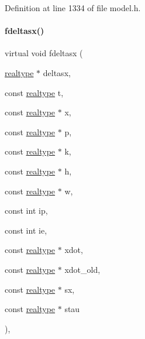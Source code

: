 Definition at line 1334 of file model.\+h.

\mbox{\label{classamici_1_1_model_ac28a487f8f0a893e03271a29098c264f}} 
\paragraph{\texorpdfstring{fdeltasx()}{fdeltasx()}\hspace{0.1cm}{\footnotesize\ttfamily [2/2]}}
{\footnotesize\ttfamily virtual void fdeltasx (\begin{DoxyParamCaption}\item[{\mbox{\hyperlink{namespaceamici_a1bdce28051d6a53868f7ccbf5f2c14a3}{realtype}} $\ast$}]{deltasx,  }\item[{const \mbox{\hyperlink{namespaceamici_a1bdce28051d6a53868f7ccbf5f2c14a3}{realtype}}}]{t,  }\item[{const \mbox{\hyperlink{namespaceamici_a1bdce28051d6a53868f7ccbf5f2c14a3}{realtype}} $\ast$}]{x,  }\item[{const \mbox{\hyperlink{namespaceamici_a1bdce28051d6a53868f7ccbf5f2c14a3}{realtype}} $\ast$}]{p,  }\item[{const \mbox{\hyperlink{namespaceamici_a1bdce28051d6a53868f7ccbf5f2c14a3}{realtype}} $\ast$}]{k,  }\item[{const \mbox{\hyperlink{namespaceamici_a1bdce28051d6a53868f7ccbf5f2c14a3}{realtype}} $\ast$}]{h,  }\item[{const \mbox{\hyperlink{namespaceamici_a1bdce28051d6a53868f7ccbf5f2c14a3}{realtype}} $\ast$}]{w,  }\item[{const int}]{ip,  }\item[{const int}]{ie,  }\item[{const \mbox{\hyperlink{namespaceamici_a1bdce28051d6a53868f7ccbf5f2c14a3}{realtype}} $\ast$}]{xdot,  }\item[{const \mbox{\hyperlink{namespaceamici_a1bdce28051d6a53868f7ccbf5f2c14a3}{realtype}} $\ast$}]{xdot\+\_\+old,  }\item[{const \mbox{\hyperlink{namespaceamici_a1bdce28051d6a53868f7ccbf5f2c14a3}{realtype}} $\ast$}]{sx,  }\item[{const \mbox{\hyperlink{namespaceamici_a1bdce28051d6a53868f7ccbf5f2c14a3}{realtype}} $\ast$}]{stau }\end{DoxyParamCaption})\hspace{0.3cm}{\ttfamily [protected]}, {\ttfamily [virtual]}}

